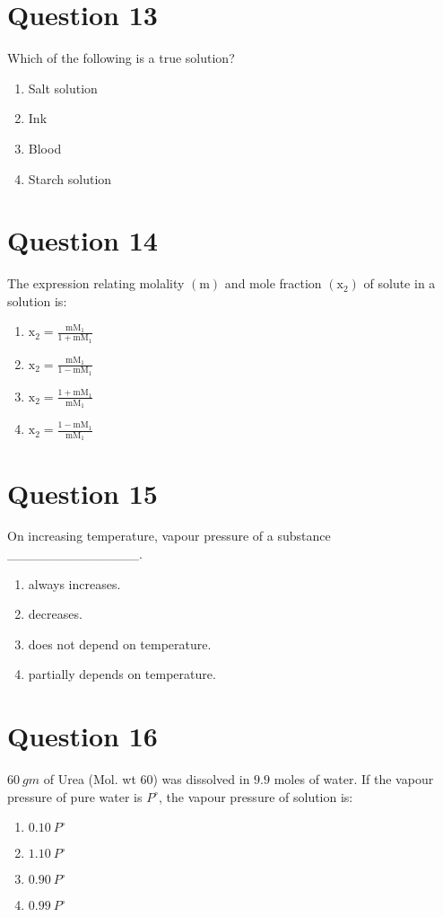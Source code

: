 \documentclass{article}
\begin{document}
\section*{Question 13}
Which of the following is a true solution?
\begin{enumerate}[label=(\alph*)]
\item Salt solution
\item Ink
\item Blood
\item Starch solution
\end{enumerate}
\newpage
\section*{Question 14}
The expression relating molality \((\mathrm{m})\) and mole fraction \(\left(\mathrm{x}_2\right)\) of solute in a solution is:
\begin{enumerate}[label=(\alph*)]
\item \(\mathrm{x}_2=\frac{\mathrm{mM}_1}{1+\mathrm{mM}_1}\)
\item \(\mathrm{x}_2=\frac{\mathrm{mM}_1}{1-\mathrm{mM}_1}\)
\item \(\mathrm{x}_2=\frac{1+\mathrm{mM}_1}{\mathrm{mM}_1}\)
\item \(\mathrm{x}_2=\frac{1-\mathrm{mM}_1}{\mathrm{mM}_1}\)
\end{enumerate}
\newpage
\section*{Question 15}
On increasing temperature, vapour pressure of a substance ______________.
\begin{enumerate}[label=(\alph*)]
\item always increases.
\item decreases.
\item does not depend on temperature.
\item partially depends on temperature.
\end{enumerate}
\newpage
\section*{Question 16}
\(60 {~gm}\) of Urea (Mol. wt 60) was dissolved in \(9.9\) moles of water. If the vapour pressure of pure water is \({P}^{\circ}\), the vapour pressure of solution is:\newline
\begin{enumerate}[label=(\alph*)]
\item \(0.10 \ {P}^{\circ}\)
\item \(1.10 \ {P}^{\circ}\)\newline
\item \(0.90 \ {P}^{\circ}\)
\item \(0.99 \ {P}^{\circ}\)
\end{enumerate}
\newpage
\end{document}
